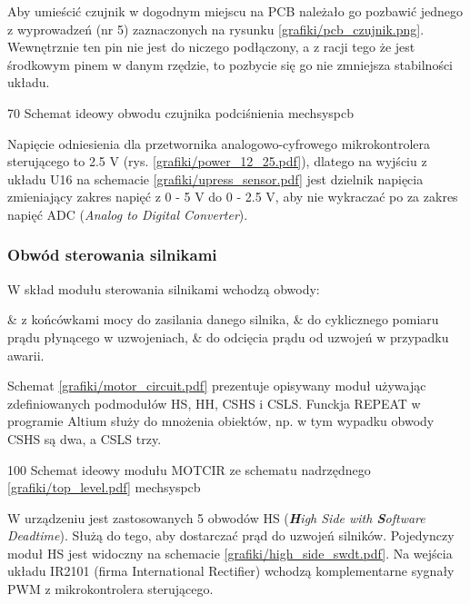 Aby umieścić czujnik w dogodnym miejscu na PCB należało go pozbawić jednego z wyprowadzeń (nr 5) zaznaczonych na rysunku \ref{grafiki/pcb_czujnik.png}. Wewnętrznie ten pin nie jest do niczego podłączony, a z racji tego że jest środkowym pinem w danym rzędzie, to pozbycie się go nie zmniejsza stabilności układu.

	{70}
	{Schemat ideowy obwodu czujnika podciśnienia}
	{mechsyspcb}

Napięcie odniesienia dla przetwornika analogowo-cyfrowego mikrokontrolera sterującego to 2.5 V (rys. \ref{grafiki/power_12_25.pdf}), dlatego na wyjściu z układu U16 na schemacie \ref{grafiki/upress_sensor.pdf} jest dzielnik napięcia zmieniający zakres napięć z 0 - 5 V do 0 - 2.5 V, aby nie wykraczać po za zakres napięć ADC ({\it Analog to Digital Converter}).

\subsubsection{Obwód sterowania silnikami}
\label{sss:sterowanie_silnikami}

W skład modułu sterowania silnikami wchodzą obwody: \\

\begin{easylist}
	& z końcówkami mocy do zasilania danego silnika,
	& do cyklicznego pomiaru prądu płynącego w uzwojeniach,
	& do odcięcia prądu od uzwojeń w przypadku awarii.
	\\
\end{easylist} 
	
Schemat \ref{grafiki/motor_circuit.pdf} prezentuje opisywany moduł używając zdefiniowanych podmodułów HS, HH, CSHS i CSLS. Funckja REPEAT w programie Altium służy do mnożenia obiektów, np. w tym wypadku obwody CSHS są dwa, a CSLS trzy.

\clearpage

	{100}
	{Schemat ideowy modułu MOTCIR ze schematu nadrzędnego \ref{grafiki/top_level.pdf}}
	{mechsyspcb}


W urządzeniu jest zastosowanych 5 obwodów HS (\textit{\textbf{H}igh Side with \textbf{S}oftware Deadtime}). Służą do tego, aby dostarczać prąd do uzwojeń silników. Pojedynczy moduł HS jest widoczny na schemacie \ref{grafiki/high_side_swdt.pdf}. Na wejścia układu IR2101 (firma International Rectifier) wchodzą komplementarne sygnały PWM z mikrokontrolera sterującego. \\

